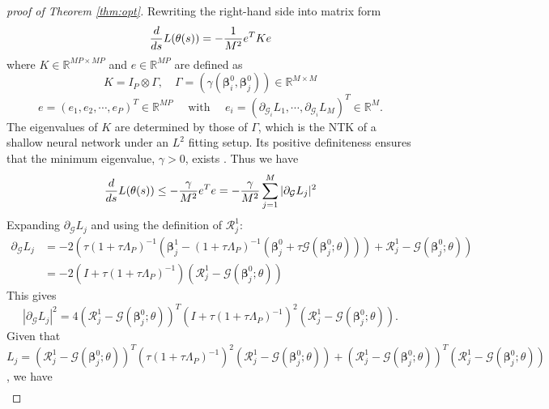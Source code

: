 \documentclass[preprint,12pt]{elsarticle}
\theoremstyle{plain}
\numberwithin{figure}{section}
\numberwithin{table}{section}
\begin{document}
\begin{proof}[proof of Theorem \ref{thm:opt}]
	Rewriting the right-hand side into matrix form
	\begin{equation}
		{d\over ds}L(\theta(s)) = -{1\over M^2}e^TKe
	\end{equation}
	where $K\in\mathbb{R}^{MP\times MP}$ and $e\in\mathbb{R}^{MP}$ are defined as
	\begin{equation}
		K = I_P\otimes\Gamma ,\quad \Gamma=(\gamma(\bm{\beta}_i^0,\bm{\beta}_j^0))\in\mathbb{R}^{M\times M}
	\end{equation}
	\begin{equation}
		e = (e_1,e_2,\cdots,e_P)^T\in\mathbb{R}^{MP} \quad \text{ with }\quad  e_i = (\partial_{\mathcal{G}_i}{L}_1,\cdots,\partial_{\mathcal{G}_i}{L}_M)^T\in\mathbb{R}^M.
	\end{equation}
	The eigenvalues of $K$ are determined by those of $\Gamma$, which is the NTK of a shallow neural network under an $L^2$ fitting setup. Its positive definiteness ensures that the minimum eigenvalue, $\gamma > 0$, exists \cite{jacot2018neural}. Thus we have
	\begin{equation}
		{d\over ds}L(\theta(s)) \le  -{\gamma\over M^2} e^Te=-{\gamma\over M^2}\sum_{j=1}^M |\partial_{\mathcal{G}}{L}_j|^2
	\end{equation}
	Expanding $\partial_{\mathcal{G}} L_j$ and using the definition of $\mathcal{R}_j^1$:
	\begin{equation}\label{eq:Lj}
		\begin{aligned}
			\partial_{\mathcal{G}}L_j &= 
			-2(\tau(1+\tau\Lambda_P)^{-1}(\bm{\beta}_j^1-(1+\tau\Lambda_P)^{-1}(\bm{\beta}_j^0+\tau\mathcal{G}(\bm{\beta}_j^0;\theta)))+ \mathcal{R}_j^1-\mathcal{G}(\bm{\beta}_j^0;\theta))\\
			& = -2(I+\tau(1+\tau\Lambda_P)^{-1})(\mathcal{R}^1_j-\mathcal{G}(\bm{\beta}_j^0;\theta))
		\end{aligned}
	\end{equation}
	This gives
	\begin{equation}
		|\partial_{\mathcal{G}}{L}_j|^2 = 4(\mathcal{R}^1_j-\mathcal{G}(\bm{\beta}_j^0;\theta))^T(I+\tau(1+\tau\Lambda_P)^{-1})^2(\mathcal{R}^1_j-\mathcal{G}(\bm{\beta}_j^0;\theta)).
	\end{equation}
	Given that $L_j = (\mathcal{R}^1_j-\mathcal{G}(\bm{\beta}_j^0;\theta))^T(\tau(1+\tau\Lambda_P)^{-1})^2(\mathcal{R}^1_j-\mathcal{G}(\bm{\beta}_j^0;\theta))+(\mathcal{R}^1_j-\mathcal{G}(\bm{\beta}_j^0;\theta))^T(\mathcal{R}^1_j-\mathcal{G}(\bm{\beta}_j^0;\theta))$, we have
	\begin{equation}
		\begin{aligned}

\end{aligned}
\end{equation}
\end{proof}
\end{document}
